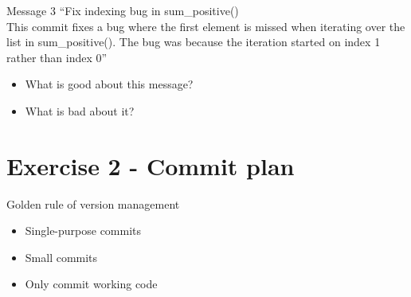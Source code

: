 \begin{frame}
\begin{block}{Message 3}
    \enquote{Fix indexing bug in sum\_positive()\\ \vspace{10 pt} 
    This commit fixes a bug where the first element is missed when iterating over the list in sum\_positive(). The bug was because the iteration started on index 1 rather than index 0}
\end{block}

\begin{question}
\begin{itemize}
    \pause
    \item What is good about this message?
    \pause
    \item What is bad about it?
\end{itemize}
\end{question}
    
\end{frame}


\section{Exercise 2 - Commit plan}

\begin{frame}
  \begin{block}{Golden rule of version management}
    \begin{itemize}
      \item Single-purpose commits
      \item Small commits
      \item Only commit working code
    \end{itemize}
  \end{block}
\end{frame}

